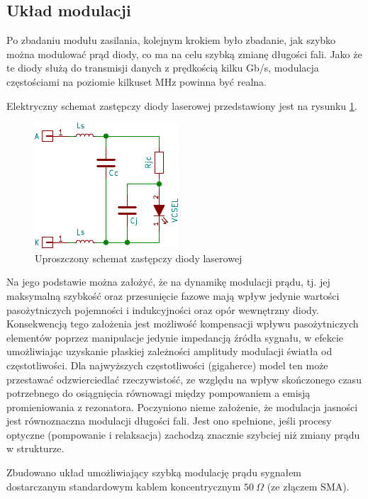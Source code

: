 \documentclass[a4paper,10pt]{article}
\begin{document}
\subsection{Układ modulacji}

Po zbadaniu modułu zasilania, kolejnym krokiem było zbadanie, jak szybko można modulować prąd diody, co ma na celu szybką zmianę długości fali. Jako że te diody służą do transmisji danych z prędkością kilku Gb/s, modulacja częstościami na poziomie kilkuset MHz powinna być realna. 

Elektryczny schemat zastępczy diody laserowej przedstawiony jest na rysunku \ref{sch-mod1}. 
\begin{figure}[h]
\begin{center}
 \includegraphics{./obrazki/sch_mod1.pdf}
\end{center}
\caption{Uproszczony schemat zastępczy diody laserowej}
\label{sch-mod1}
\end{figure}
Na jego podstawie można założyć, że na dynamikę modulacji prądu, tj. jej maksymalną szybkość oraz przesunięcie fazowe mają wpływ jedynie wartości pasożytniczych pojemności i indukcyjności oraz opór wewnętrzny diody. Konsekwencją tego założenia jest możliwość kompensacji wpływu pasożytniczych elementów poprzez manipulacje jedynie impedancją źródła sygnału, w efekcie umożliwiając uzyskanie płaskiej zależności amplitudy modulacji światła od częstotliwości.
Dla najwyższych częstotliwości (gigaherce) model ten może przestawać odzwierciedlać rzeczywistość, ze względu na wpływ skończonego czasu potrzebnego do osiągnięcia równowagi między pompowaniem a emisją promieniowania z rezonatora. Poczyniono nieme założenie, że modulacja jasności jest równoznaczna modulacji długości fali. Jest ono spełnione, jeśli procesy optyczne (pompowanie i relaksacja) zachodzą znacznie szybciej niż zmiany prądu w strukturze.

Zbudowano układ umożliwiający szybką modulację prądu sygnałem dostarczanym standardowym kablem koncentrycznym $50~\Omega$ (ze złączem SMA).
\end{document}
